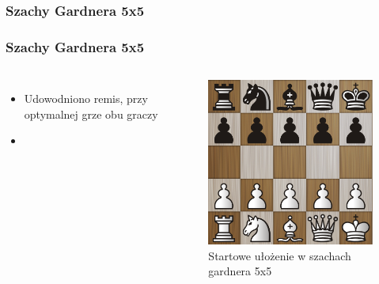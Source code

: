 \documentclass[polish,envcountsect,10pt]{beamer}
\begin{document}
            \subsubsection{Szachy Gardnera 5x5}
                \begin{frame}
                    \frametitle{Szachy Gardnera 5x5}
                    \begin{columns}
                        \begin{itemize}
                            \item Udowodniono remis, przy optymalnej grze obu graczy \cite{minichess}
                            \item 
                        \end{itemize}
                            \begin{figure}[H]
                                \centering
                                \includegraphics[width=\textwidth]{images/gardner.png}
                                \caption{Startowe ułożenie w szachach gardnera 5x5}
                            \end{figure}    
                    \end{columns}
                \end{frame}
\end{document}
